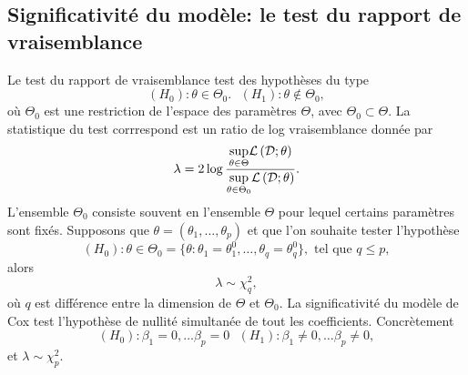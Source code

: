 \subsection{Significativité du modèle: le test du rapport de vraisemblance}
Le test du rapport de vraisemblance test des hypothèses du type
$$
(H_0): \theta\in \Theta_0.\text{  }(H_1):\theta \notin\Theta_0,
$$
où $\Theta_0$ est une restriction de l'espace des paramètres $\Theta$, avec $\Theta_0\subset \Theta$. La statistique du test corrrespond est un ratio de log vraisemblance donnée par 
$$
\lambda = 2\log\frac{\underset{\theta \in \Theta}{\sup}\mathcal{L}\left(\mathcal{D} ; \theta\right)}{\underset{\theta \in \Theta_0}{\sup}\mathcal{L}\left(\mathcal{D} ; \theta\right)}.
$$
L'ensemble $\Theta_0$ consiste souvent en l'ensemble $\Theta$ pour lequel certains paramètres sont fixés. Supposons que $\theta = (\theta_1,\ldots,\theta_p)$ et que l'on souhaite tester l'hypothèse
$$
(H_0):\theta\in \Theta_0= \{\theta : \theta_1 = \theta_1^0,\ldots,\theta_q = \theta^0_q\},\text{ tel que } q \leq p, 
$$
alors 
$$
\lambda \sim \chi^2_{q},
$$
où $q$ est différence entre la dimension de $\Theta$ et $\Theta_0$. La significativité du modèle de Cox test l'hypothèse de nullité simultanée de tout les coefficients. Concrètement 
$$
(H_0): \beta_1=0,\ldots\beta_p = 0\text{ }(H_1):\beta_1\neq0,\ldots\beta_p \neq 0,
$$
et $\lambda \sim \chi_p^2$.
